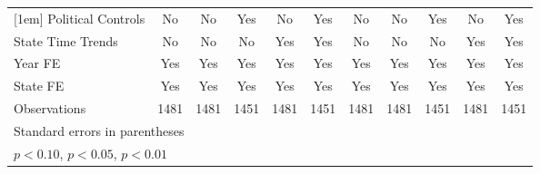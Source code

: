 {\begin{longtable}{l*{10}{c}}
[1em]
Political Controls  &          No         &          No         &         Yes         &          No         &         Yes         &          No         &          No         &         Yes         &          No         &         Yes         \\
[1em]
State Time Trends   &          No         &          No         &          No         &         Yes         &         Yes         &          No         &          No         &          No         &         Yes         &         Yes         \\
[1em]
Year FE             &         Yes         &         Yes         &         Yes         &         Yes         &         Yes         &         Yes         &         Yes         &         Yes         &         Yes         &         Yes         \\
[1em]
State FE            &         Yes         &         Yes         &         Yes         &         Yes         &         Yes         &         Yes         &         Yes         &         Yes         &         Yes         &         Yes         \\
\hline
Observations        &        1481         &        1481         &        1451         &        1481         &        1451         &        1481         &        1481         &        1451         &        1481         &        1451         \\
\hline\hline
\multicolumn{11}{l}{\footnotesize Standard errors in parentheses}\\
\multicolumn{11}{l}{\footnotesize \sym{*} \(p<0.10\), \sym{**} \(p<0.05\), \sym{***} \(p<0.01\)}\\
\end{longtable}
}
